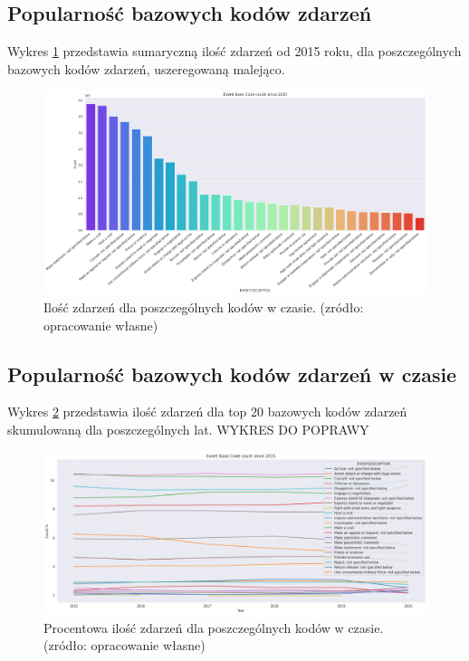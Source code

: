 \documentclass[11pt]{report}
\begin{document}
 \subsection{Popularność bazowych kodów zdarzeń}
  	Wykres \ref{fig:GLOBALEBC} przedstawia sumaryczną ilość zdarzeń od 2015 roku, dla poszczególnych bazowych kodów zdarzeń, uszeregowaną malejąco.
  	  \begin{figure}[ht]
	\centering
	\includegraphics[width=0.8 \textwidth]{fig/GLOBAL/EBC.png}
	\caption{Ilość zdarzeń dla poszczególnych kodów w czasie. (zródło: opracowanie własne)}
	\label{fig:GLOBALEBC}
	\end{figure}
	
 \subsection{Popularność bazowych kodów zdarzeń w czasie}
  Wykres \ref{fig:GLOBALEBCperc} przedstawia ilość zdarzeń dla top 20 bazowych kodów zdarzeń skumulowaną dla poszczególnych lat.
   WYKRES DO POPRAWY
     \begin{figure}[ht]
	\centering
	\includegraphics[width=0.8 \textwidth]{fig/GLOBAL/EBCperc.png}
	\caption{Procentowa ilość zdarzeń dla poszczególnych kodów w czasie. (zródło: opracowanie własne)}
	\label{fig:GLOBALEBCperc}
	\end{figure}
	
\end{document}
